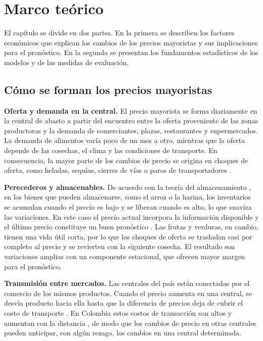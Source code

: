 \chapter{Marco teórico}
\label{cap:marco}

El capítulo se divide en dos partes. En la primera se describen los factores económicos que explican los cambios de los precios mayoristas y sus implicaciones para el pronóstico. En la segunda se presentan los fundamentos estadísticos de los modelos y de las medidas de evaluación.

\section{Cómo se forman los precios mayoristas}
\label{sec:economia}

\textbf{Oferta y demanda en la central.} El precio mayorista se forma diariamente en la central de abasto a partir del encuentro entre la oferta proveniente de las zonas productoras y la demanda de comerciantes, plazas, restaurantes y supermercados. La demanda de alimentos varía poco de un mes a otro, mientras que la oferta depende de las cosechas, el clima y las condiciones de transporte. En consecuencia, la mayor parte de los cambios de precio se origina en choques de oferta, como heladas, sequías, cierres de vías o paros de transportadores \citep{bohorquez2026}.

\textbf{Perecederos y almacenables.} De acuerdo con la teoría del almacenamiento \citep{working1949,deaton1992}, en los bienes que pueden almacenarse, como el arroz o la harina, los inventarios se acumulan cuando el precio es bajo y se liberan cuando es alto, lo que suaviza las variaciones. En este caso el precio actual incorpora la información disponible y el último precio constituye un buen pronóstico \citep{samuelson1965}. Las frutas y verduras, en cambio, tienen una vida útil corta, por lo que los choques de oferta se trasladan casi por completo al precio y se revierten con la siguiente cosecha. El resultado son variaciones amplias con un componente estacional, que ofrecen mayor margen para el pronóstico.

\textbf{Transmisión entre mercados.} Las centrales del país están conectadas por el comercio de los mismos productos. Cuando el precio aumenta en una central, se desvía producto hacia ella hasta que la diferencia de precios deja de cubrir el costo de transporte \citep{takayama1964,fackler2001}. En Colombia estos costos de transacción son altos y aumentan con la distancia \citep{gafaro2020}, de modo que los cambios de precio en otras centrales pueden anticipar, con algún rezago, los cambios en una central determinada.

